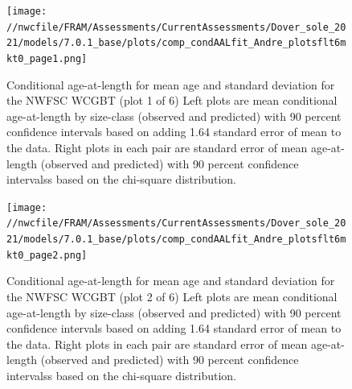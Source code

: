 \documentclass[11pt,
  english,
  a4paper,
]{article}
\begin{document}
\begin{figure}
\centering
\texttt{[image: //nwcfile/FRAM/Assessments/CurrentAssessments/Dover\_sole\_2021/models/7.0.1\_base/plots/comp\_condAALfit\_Andre\_plotsflt6mkt0\_page1.png]}
\caption{Conditional age-at-length for mean age and standard deviation for the NWFSC WCGBT (plot 1 of 6) Left plots are mean conditional age-at-length by size-class (observed and predicted) with 90 percent confidence intervals based on adding 1.64 standard error of mean to the data. Right plots in each pair are standard error of mean age-at-length (observed and predicted) with 90 percent confidence intervalss based on the chi-square distribution.\label{fig:wcgbt-caal-fit-1}}
\end{figure}

\tagmcend\tagstructend


\begin{figure}
\centering
\texttt{[image: //nwcfile/FRAM/Assessments/CurrentAssessments/Dover\_sole\_2021/models/7.0.1\_base/plots/comp\_condAALfit\_Andre\_plotsflt6mkt0\_page2.png]}
\caption{Conditional age-at-length for mean age and standard deviation for the NWFSC WCGBT (plot 2 of 6) Left plots are mean conditional age-at-length by size-class (observed and predicted) with 90 percent confidence intervals based on adding 1.64 standard error of mean to the data. Right plots in each pair are standard error of mean age-at-length (observed and predicted) with 90 percent confidence intervalss based on the chi-square distribution.\label{fig:wcgbt-caal-fit-2}}
\end{figure}

\tagmcend\tagstructend

\end{document}
